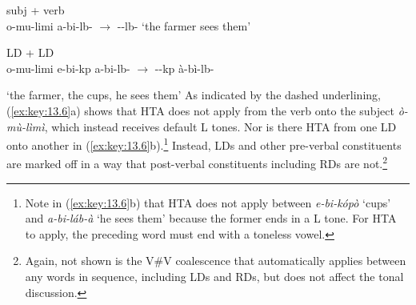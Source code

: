 \documentclass[output=paper]{langsci/langscibook}
\begin{document}
\ea\label{ex:key:13.6}
    \ea subj + verb\\
    o-mu-limi  a-bi-lb- ${\rightarrow}$
    --lb-  ‘the farmer sees them’
        \vspace{.75\baselineskip}
    \ex \gls{LD} + {LD}\\
        o-mu-limi e-bi-kp a-bi-lb-
            ${\rightarrow}$ --kp
                à-bì-lb-\\\vspace{1\baselineskip}
        ‘the farmer, the cups, he sees them’
    \z
\z
As indicated by the dashed underlining, (\ref{ex:key:13.6}a) shows that \gls{HTA}
does not apply from the verb onto the subject \emph{ò-mù-lìmì}, which instead
receives default L tones. Nor is there \gls{HTA} from one \gls{LD} onto another in
(\ref{ex:key:13.6}b).\footnote{Note in (\ref{ex:key:13.6}b) that \gls{HTA} does not
    apply between \emph{e-bi-kópò} ‘cups’ and \emph{a-bi-láb-à} ‘he sees them’
because the former ends in a L tone. For \gls{HTA} to apply, the preceding word
must end with a toneless vowel.}  Instead, \glspl{LD} and other pre-verbal
constituents are marked off in a way that post-verbal constituents including
RDs are not.\footnote{Again, not shown is the V\#V coalescence that
automatically applies between any words in sequence, including \glspl{LD} and RDs, but
does not affect the tonal discussion.}
\end{document}
